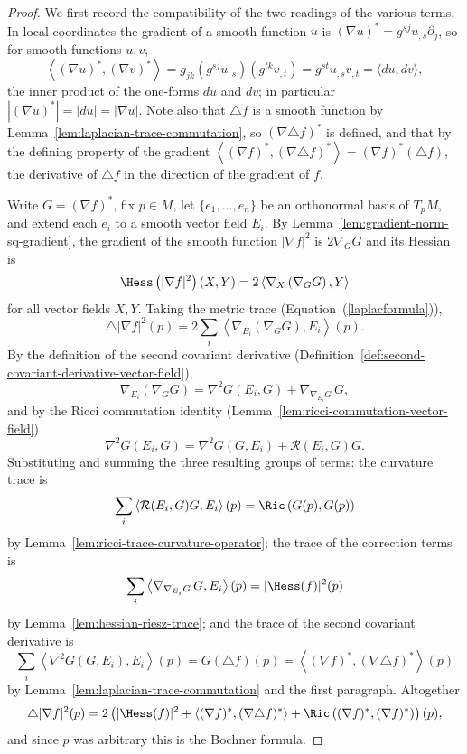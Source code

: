 \begin{proof}
\leanok
We first record the compatibility of the two readings of the various
terms. In local coordinates the gradient of a smooth function $u$ is
$(\nabla u)^*=g^{sj}u_{,s}\partial_j$, so for smooth functions $u,v$,
$$\left\langle(\nabla u)^*,(\nabla v)^*\right\rangle
=g_{jk}\left(g^{sj}u_{,s}\right)\left(g^{tk}v_{,t}\right)
=g^{st}u_{,s}v_{,t}
=\langle du,dv\rangle,$$
the inner product of the one-forms $du$ and $dv$; in particular
$\left|(\nabla u)^*\right|=|du|=|\nabla u|$. Note also that
$\triangle f$ is a smooth function by
Lemma~\ref{lem:laplacian-trace-commutation}, so $(\nabla\triangle f)^*$
is defined, and that by the defining property of the gradient
$\left\langle(\nabla f)^*,(\nabla\triangle f)^*\right\rangle
=(\nabla f)^*(\triangle f)$, the derivative of $\triangle f$ in the
direction of the gradient of $f$.

Write $G=(\nabla f)^*$, fix $p\in M$, let $\{e_1,\ldots,e_n\}$ be an
orthonormal basis of $T_pM$, and extend each $e_i$ to a smooth vector
field $E_i$. By Lemma~\ref{lem:gradient-norm-sq-gradient}, the gradient
of the smooth function $|\nabla f|^2$ is $2\nabla_GG$ and its Hessian
is
$$\Hess\left(|\nabla f|^2\right)(X,Y)
=2\left\langle\nabla_X\left(\nabla_GG\right),Y\right\rangle$$
for all vector fields $X,Y$. Taking the metric trace
(Equation~(\ref{laplacformula})),
$$\triangle|\nabla f|^2(p)
=2\sum_i\left\langle\nabla_{E_i}\left(\nabla_GG\right),E_i\right\rangle(p).$$
By the definition of the second covariant derivative
(Definition~\ref{def:second-covariant-derivative-vector-field}),
$$\nabla_{E_i}\left(\nabla_GG\right)
=\nabla^2G(E_i,G)+\nabla_{\nabla_{E_i}G}\,G,$$
and by the Ricci commutation identity
(Lemma~\ref{lem:ricci-commutation-vector-field})
$$\nabla^2G(E_i,G)=\nabla^2G(G,E_i)+{\mathcal R}(E_i,G)G.$$
Substituting and summing the three resulting groups of terms: the
curvature trace is
$$\sum_i\left\langle{\mathcal R}(E_i,G)G,E_i\right\rangle(p)
=\Ric\left(G(p),G(p)\right)$$
by Lemma~\ref{lem:ricci-trace-curvature-operator}; the trace of the
correction terms is
$$\sum_i\left\langle\nabla_{\nabla_{E_i}G}\,G,E_i\right\rangle(p)
=|\Hess(f)|^2(p)$$
by Lemma~\ref{lem:hessian-riesz-trace}; and the trace of the second
covariant derivative is
$$\sum_i\left\langle\nabla^2G(G,E_i),E_i\right\rangle(p)
=G(\triangle f)(p)
=\left\langle(\nabla f)^*,(\nabla\triangle f)^*\right\rangle(p)$$
by Lemma~\ref{lem:laplacian-trace-commutation} and the first
paragraph. Altogether
$$\triangle|\nabla f|^2(p)
=2\left(|\Hess(f)|^2
+\left\langle(\nabla f)^*,(\nabla\triangle f)^*\right\rangle
+\Ric\left((\nabla f)^*,(\nabla f)^*\right)\right)(p),$$
and since $p$ was arbitrary this is the Bochner formula.
\end{proof}

